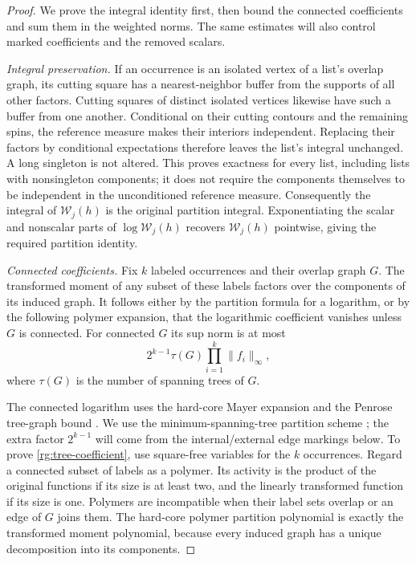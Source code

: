 \begin{proof}
We prove the integral identity first, then bound the connected
coefficients and sum them in the weighted norms.  The same estimates
will also control marked coefficients and the removed scalars.

\emph{Integral preservation.}
If an occurrence is an isolated vertex of a list's overlap graph, its
cutting square has a nearest-neighbor buffer from the supports of all
other factors.  Cutting squares of distinct isolated vertices likewise
have such a buffer from one another.  Conditional on their cutting
contours and the remaining spins, the reference measure makes their
interiors independent.  Replacing their factors by conditional
expectations therefore leaves the list's integral unchanged.  A long
singleton is not altered.  This proves exactness for every list, including
lists with nonsingleton components; it does not require the components
themselves to be independent in the unconditioned reference measure.
Consequently the integral of $\mathcal W_j(h)$ is the original partition
integral.  Exponentiating the scalar and nonscalar parts of
$\log\mathcal W_j(h)$ recovers $\mathcal W_j(h)$ pointwise, giving
the required partition identity.

\emph{Connected coefficients.}
Fix $k$ labeled occurrences and
their overlap graph $G$.  The transformed moment of any subset of these
labels factors over the components of its induced graph.  It follows
either by the partition formula for a logarithm, or by the following
polymer expansion, that the logarithmic coefficient vanishes unless
$G$ is connected.  For connected $G$ its sup norm is at most
\begin{equation}
 2^{k-1}\tau(G)\prod_{i=1}^k\|f_i\|_\infty,
 \label{rg:tree-coefficient}
\end{equation}
where $\tau(G)$ is the number of spanning trees of $G$.

The connected logarithm uses the hard-core Mayer expansion and the
Penrose tree-graph bound \cite[Section~2 and Proposition~5]{FP2007}.
We use the minimum-spanning-tree partition scheme
\cite[Section~3.2]{PY2017}; the extra factor $2^{k-1}$ will come
from the internal/external edge markings below.
To prove \eqref{rg:tree-coefficient}, use square-free variables for the
$k$ occurrences.  Regard a connected subset of labels as a polymer.  Its
activity is the product of the original functions if its size is at
least two, and the linearly transformed function if its size is one.
Polymers are incompatible when their label sets overlap or an edge of
$G$ joins them.  The hard-core polymer partition polynomial is exactly
the transformed moment polynomial, because every induced graph has a
unique decomposition into its components.


\end{proof}
